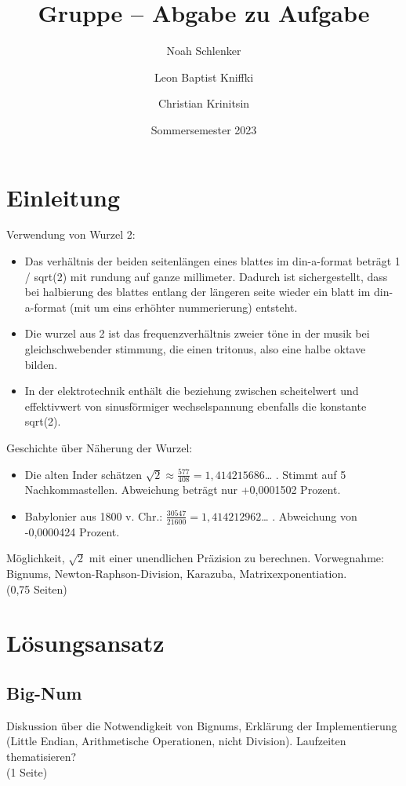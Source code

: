 \documentclass[course=erap]{aspdoc}
\author{Noah Schlenker \and Leon Baptist Kniffki \and Christian Krinitsin}
\date{Sommersemester 2023} %
\title{Gruppe \theGroup{} -- Abgabe zu Aufgabe \theNumber}
\begin{document}
\maketitle

\section{Einleitung}

Verwendung von Wurzel 2:
\begin{itemize}
  \item Das verhältnis der beiden seitenlängen eines blattes im din-a-format beträgt 1 / sqrt(2) mit rundung auf 
        ganze millimeter. Dadurch ist sichergestellt, dass bei halbierung des blattes entlang der längeren seite wieder 
        ein blatt im din-a-format (mit um eins erhöhter nummerierung) entsteht.
  \item Die wurzel aus 2 ist das frequenzverhältnis zweier töne in der musik bei gleichschwebender stimmung, die einen tritonus, 
        also eine halbe oktave bilden.
  \item In der elektrotechnik enthält die beziehung zwischen scheitelwert und effektivwert von sinusförmiger wechselspannung ebenfalls die konstante 
        sqrt(2).
\end{itemize}

Geschichte über Näherung der Wurzel:
\begin{itemize}
  \item Die alten Inder schätzen $\sqrt{2} \approx \tfrac {577}{408} = 1,414215686$… . Stimmt auf 5 Nachkommastellen. Abweichung beträgt nur +0,0001502 Prozent.
  \item Babylonier aus 1800 v. Chr.: $\tfrac {30547}{21600} = 1,414212962$… . Abweichung von -0,0000424 Prozent.
\end{itemize}

Möglichkeit, $\sqrt{2}$ mit einer unendlichen Präzision zu berechnen. Vorwegnahme: Bignums, Newton-Raphson-Division, Karazuba, Matrixexponentiation. \\
(0,75 Seiten)

\section{Lösungsansatz}

\subsection{Big-Num}
Diskussion über die Notwendigkeit von Bignums, Erklärung der Implementierung (Little Endian, Arithmetische Operationen, nicht Division). Laufzeiten thematisieren? \\
(1 Seite)
\end{document}
